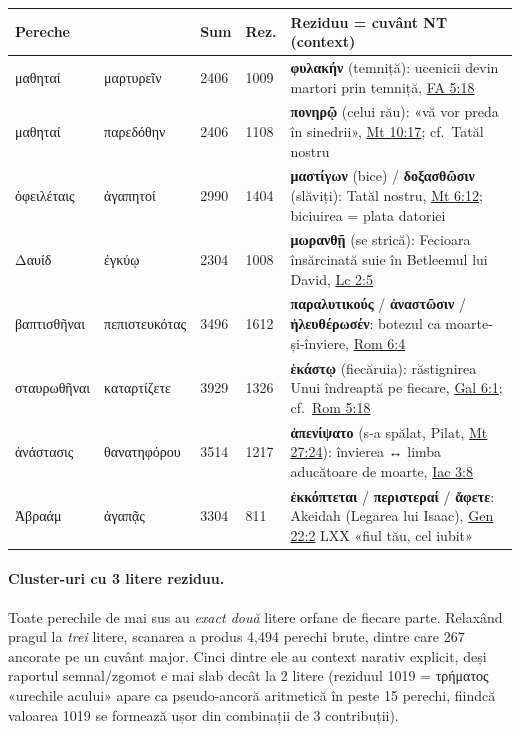 \documentclass[12pt,a4paper,twoside,openany]{book}
\begin{document}
\begin{center}
\footnotesize
\begin{tabular}{L{2.6cm}L{2.6cm}C{0.8cm}C{1cm}L{6.3cm}}
\toprule
{}
\textbf{Pereche} & & \textbf{Sum} & \textbf{Rez.} & \textbf{Reziduu = cuvânt NT (context)} \\
\midrule
μαθηταί & μαρτυρεῖν & 2406 & 1009 & \textbf{φυλακήν} (temniță): ucenicii devin martori prin temniță, \href{https://bibliaortodoxa.ro/carte.php?id=51\&cap=5\#18}{FA 5:18} \\
μαθηταί & παρεδόθην & 2406 & 1108 & \textbf{πονηρῷ} (celui rău): «vă vor preda în sinedrii», \href{https://bibliaortodoxa.ro/carte.php?id=55\&cap=10\#17}{Mt 10:17}; cf.~Tatăl nostru \\
ὀφειλέταις & ἀγαπητοί & 2990 & 1404 & \textbf{μαστίγων} (bice) / \textbf{δοξασθῶσιν} (slăviți): Tatăl nostru, \href{https://bibliaortodoxa.ro/carte.php?id=55\&cap=6\#12}{Mt 6:12}; biciuirea = plata datoriei \\
Δαυίδ & ἐγκύῳ & 2304 & 1008 & \textbf{μωρανθῇ} (se strică): Fecioara însărcinată suie în Betleemul lui David, \href{https://bibliaortodoxa.ro/carte.php?id=48\&cap=2\#5}{Lc 2:5} \\
βαπτισθῆναι & πεπιστευκότας & 3496 & 1612 & \textbf{παραλυτικούς} / \textbf{ἀναστῶσιν} / \textbf{ἠλευθέρωσέν}: botezul ca moarte-și-înviere, \href{https://bibliaortodoxa.ro/carte.php?id=52\&cap=6\#4}{Rom 6:4} \\
σταυρωθῆναι & καταρτίζετε & 3929 & 1326 & \textbf{ἑκάστῳ} (fiecăruia): răstignirea Unui îndreaptă pe fiecare, \href{https://bibliaortodoxa.ro/carte.php?id=58\&cap=6\#1}{Gal 6:1}; cf.~\href{https://bibliaortodoxa.ro/carte.php?id=52\&cap=5\#18}{Rom 5:18} \\
ἀνάστασις & θανατηφόρου & 3514 & 1217 & \textbf{ἀπενίψατο} (s-a spălat, Pilat, \href{https://bibliaortodoxa.ro/carte.php?id=55\&cap=27\#24}{Mt 27:24}): învierea ↔ limba aducătoare de moarte, \href{https://bibliaortodoxa.ro/carte.php?id=66\&cap=3\#8}{Iac 3:8} \\
Ἀβραάμ & ἀγαπᾷς & 3304 & 811 & \textbf{ἐκκόπτεται} / \textbf{περιστεραί} / \textbf{ἄφετε}: Akeidah (Legarea lui Isaac), \href{https://bibliaortodoxa.ro/carte.php?id=1\&cap=22\#2}{Gen 22:2} LXX «fiul tău, cel iubit» \\
\bottomrule
\end{tabular}
\end{center}

\paragraph*{Cluster-uri cu 3 litere reziduu.} Toate perechile de mai sus au \textit{exact două} litere orfane de fiecare parte. Relaxând pragul la \textit{trei} litere, scanarea a produs 4{,}494 perechi brute, dintre care 267 ancorate pe un cuvânt major. Cinci dintre ele au context narativ explicit, deși raportul semnal/zgomot e mai slab decât la 2 litere (reziduul 1019 = τρήματος «urechile acului» apare ca pseudo-ancoră aritmetică în peste 15 perechi, fiindcă valoarea 1019 se formează ușor din combinații de 3 contribuții).
\end{document}
